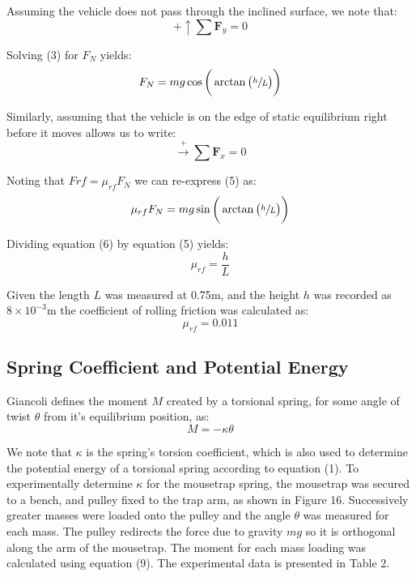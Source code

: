 \documentclass[a4paper]{article}
\newlength{\arrow}
\begin{document}
Assuming the vehicle does not pass through the inclined surface, we note that:
\begin{equation}
	 + \uparrow \sum \boldsymbol{F}_y = 0
\end{equation}

Solving (3) for $F_N$ yields:
\begin{equation}
	F_N = mg \cos \bigg( \arctan \big( \sfrac{h}{L} \big) \bigg)
\end{equation}

Similarly, assuming that the vehicle is on the edge of static equilibrium right before it moves allows us to write:
\begin{equation}
	\stackrel{+}\rightarrow \sum \boldsymbol{F}_x = 0
\end{equation}

Noting that $F{rf} = \mu_{rf} F_N$ we can re-express (5) as:
\begin{equation}
	\mu_{rf} F_N = mg \sin \bigg( \arctan\big( \sfrac{h}{L} \big) \bigg)
\end{equation}

Dividing equation (6) by equation (5) yields:
\begin{equation}
	\mu_{rf} = \frac{h}{L}
\end{equation}

Given the length $L$ was measured at 0.75$\si{\meter}$, and the height $h$ was recorded as $8 \times 10^{-3} \si{\meter}$ the coefficient of rolling friction was calculated as:
\begin{equation}
	\mu_{rf} = 0.011
\end{equation}


\subsection{Spring Coefficient and Potential Energy}
Giancoli defines the moment $M$ created by a torsional spring, for some angle of twist $\theta$ from it's equilibrium position, as:
\begin{equation}
	M = -\kappa \theta
\end{equation} 

We note that $\kappa$ is the spring's torsion coefficient, which is also used to determine the potential energy of a torsional spring according to equation (1). To experimentally determine $\kappa$ for the mousetrap spring, the mousetrap was secured to a bench, and pulley fixed to the trap arm, as shown in Figure 16. Successively greater masses were loaded onto the pulley and the angle $\theta$ was measured for each mass. The pulley redirects the force due to gravity $mg$ so it is orthogonal along the arm of the mousetrap. The moment for each mass loading was calculated using equation (9). The experimental data is presented in Table 2.
\end{document}
